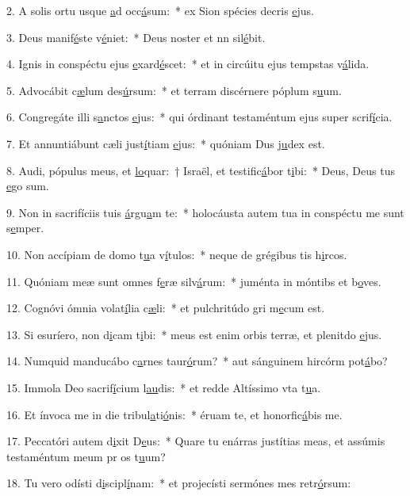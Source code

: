 2. A solis ortu usque \uline{a}d occ\uline{á}sum:~* ex Sion spécies decris \uline{e}jus.\par 
3. Deus manif\uline{é}ste v\uline{é}niet:~* Deus noster et nn sil\uline{é}bit.\par 
4. Ignis in conspéctu ejus \uline{e}xard\uline{é}scet:~* et in circúitu ejus tempstas v\uline{á}lida.\par 
5. Advocábit c\uline{æ}lum des\uline{ú}rsum:~* et terram discérnere póplum s\uline{u}um.\par 
6. Congregáte illi s\uline{a}nctos \uline{e}jus:~* qui órdinant testaméntum ejus super scrif\uline{í}cia.\par 
7. Et annuntiábunt cæli just\uline{í}tiam \uline{e}jus:~* quóniam Dus j\uline{u}dex est.\par 
8. Audi, pópulus meus, et \uline{lo}quar:~† Israël, et testific\uline{á}bor t\uline{i}bi:~* Deus, Deus tus \uline{e}go sum.\par 
9. Non in sacrifíciis tuis \uline{á}rgu\uline{a}m te:~* holocáusta autem tua in conspéctu me sunt s\uline{e}mper.\par 
10. Non accípiam de domo t\uline{u}a v\uline{í}tulos:~* neque de grégibus tis h\uline{i}rcos.\par 
11. Quóniam meæ sunt omnes f\uline{e}ræ silv\uline{á}rum:~* juménta in móntibs et b\uline{o}ves.\par 
12. Cognóvi ómnia volat\uline{í}lia c\uline{æ}li:~* et pulchritúdo gri m\uline{e}cum est.\par 
13. Si esuríero, non d\uline{i}cam t\uline{i}bi:~* meus est enim orbis terræ, et plenitdo \uline{e}jus.\par 
14. Numquid manducábo c\uline{a}rnes taur\uline{ó}rum?~* aut sánguinem hircórm pot\uline{á}bo?\par 
15. Immola Deo sacrif\uline{í}cium l\uline{au}dis:~* et redde Altíssimo vta t\uline{u}a.\par 
16. Et ínvoca me in die tribul\uline{a}ti\uline{ó}nis:~* éruam te, et honorfic\uline{á}bis me.\par 
17. Peccatóri autem d\uline{i}xit D\uline{e}us:~* Quare tu enárras justítias meas, et assúmis testaméntum meum pr os t\uline{u}um?\par 
18. Tu vero odísti d\uline{i}scipl\uline{í}nam:~* et projecísti sermónes mes retr\uline{ó}rsum:\par 
